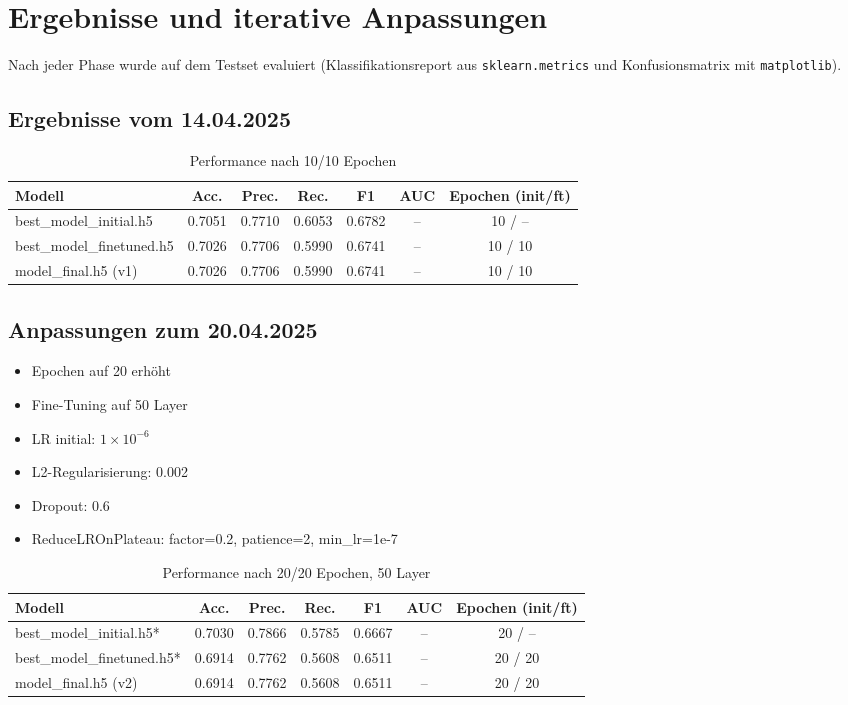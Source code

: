 \section{Ergebnisse und iterative Anpassungen}
Nach jeder Phase wurde auf dem Testset evaluiert (Klassifikationsreport aus \texttt{sklearn.metrics} und Konfusionsmatrix mit \texttt{matplotlib}).

\subsection*{Ergebnisse vom 14.04.2025}
\begin{table}[h]
\centering
\caption{Performance nach 10/10 Epochen}
\begin{tabular}{lcccccc}
\toprule
Modell                         & Acc.   & Prec.  & Rec.   & F1     & AUC & Epochen (init/ft) \\
\midrule
best\_model\_initial.h5        & 0.7051 & 0.7710 & 0.6053 & 0.6782 & –   & 10 / –            \\
best\_model\_finetuned.h5      & 0.7026 & 0.7706 & 0.5990 & 0.6741 & –   & 10 / 10           \\
model\_final.h5 (v1)           & 0.7026 & 0.7706 & 0.5990 & 0.6741 & –   & 10 / 10           \\
\bottomrule
\end{tabular}
\end{table}

\subsection*{Anpassungen zum 20.04.2025}
\begin{itemize}
  \item Epochen auf 20 erhöht
  \item Fine-Tuning auf 50 Layer
  \item LR initial: \(1\times10^{-6}\)
  \item L2-Regularisierung: 0.002
  \item Dropout: 0.6
  \item ReduceLROnPlateau: factor=0.2, patience=2, min\_lr=1e-7
\end{itemize}
\begin{table}[h]
\centering
\caption{Performance nach 20/20 Epochen, 50 Layer}
\begin{tabular}{lcccccc}
\toprule
Modell                         & Acc.   & Prec.  & Rec.   & F1     & AUC & Epochen (init/ft) \\
\midrule
best\_model\_initial.h5*       & 0.7030 & 0.7866 & 0.5785 & 0.6667 & –   & 20 / –            \\
best\_model\_finetuned.h5*     & 0.6914 & 0.7762 & 0.5608 & 0.6511 & –   & 20 / 20           \\
model\_final.h5 (v2)           & 0.6914 & 0.7762 & 0.5608 & 0.6511 & –   & 20 / 20           \\
\bottomrule
\end{tabular}
\end{table}


